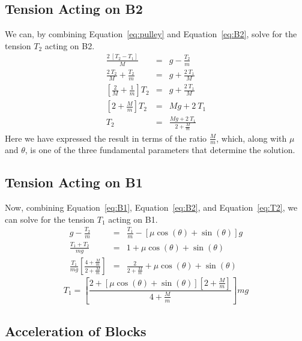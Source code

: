 \documentclass[twocolumn]{article}
\begin{document}
\subsection{Tension Acting on B2}

We can, by combining Equation~\ref{eq:pulley} and Equation~\ref{eq:B2}, solve
for the tension $T_2$ acting on B2.
\begin{eqnarray}
   \nonumber
   \frac{2 \: [T_2 - T_1]}{M} &=& g - \frac{T_2}{m}\\
   \nonumber
   \frac{2 \: T_2}{M} + \frac{T_2}{m} &=& g + \frac{2 \: T_1}{M}\\
   \nonumber
   \left[ \frac{2}{M} + \frac{1}{m} \right] T_2 &=& g + \frac{2 \: T_1}{M}\\
   \nonumber
   \left[ 2 + \frac{M}{m} \right] T_2 &=& M g + 2 \: T_1\\
   T_2 &=& \frac{M g + 2 \: T_1}{2 + \tfrac{M}{m}}
   \label{eq:T2}
\end{eqnarray}
Here we have expressed the result in terms of the ratio $\tfrac{M}{m}$, which,
along with $\mu$ and $\theta$, is one of the three fundamental parameters that
determine the solution.

\subsection{Tension Acting on B1}

Now, combining Equation~\ref{eq:B1}, Equation~\ref{eq:B2}, and
Equation~\ref{eq:T2}, we can solve for the tension $T_1$ acting on B1.
\begin{eqnarray}
   \nonumber
   g - \frac{T_2}{m} &=& \frac{T_1}{m} - [\mu \cos(\theta) + \sin(\theta)] g\\
   \nonumber
   \frac{T_1 + T_2}{mg} &=& 1 + \mu \cos(\theta) + \sin(\theta)\\
   \nonumber
   \frac{T_1}{mg} \left[ \frac{4 + \tfrac{M}{m}}{2 + \tfrac{M}{m}} \right] &=&
   \frac{2}{2 + \tfrac{M}{m}} + \mu \cos(\theta) + \sin(\theta)
\end{eqnarray}
\begin{equation}
   T_1 = \left[ \frac{2 + [\mu \cos(\theta) + \sin(\theta)][2 +
   \tfrac{M}{m}]}{4 + \tfrac{M}{m}} \right] mg
   \label{eq:T1}
\end{equation}

\subsection{Acceleration of Blocks}
\end{document}
